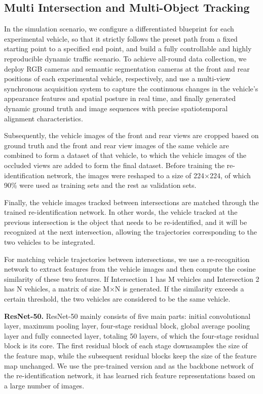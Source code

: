 \documentclass[lettersize,journal]{IEEEtran}
\begin{document}
\subsection{Multi Intersection and Multi-Object Tracking}

In the simulation scenario, we configure a differentiated blueprint for each experimental vehicle, so that it strictly follows the preset path from a fixed starting point to a specified end point, and build a fully controllable and highly reproducible dynamic traffic scenario.
To achieve all-round data collection, we deploy RGB cameras and semantic segmentation cameras at the front and rear positions of each experimental vehicle, respectively, and use a multi-view synchronous acquisition system to capture the continuous changes in the vehicle's appearance features and spatial posture in real time, and finally generated dynamic ground truth and image sequences with precise spatiotemporal alignment characteristics.

Subsequently, the vehicle images of the front and rear views are cropped based on ground truth and the front and rear view images of the same vehicle are combined to form a dataset of that vehicle, to which the vehicle images of the occluded views are added to form the final dataset.
Before training the re-identification network, the images were reshaped to a size of 224\(\times\)224, of which 90\% were used as training sets and the rest as validation sets.

Finally, the vehicle images tracked between intersections are matched through the trained re-identification network.
In other words, the vehicle tracked at the previous intersection is the object that needs to be re-identified, and it will be recognized at the next intersection, allowing the trajectories corresponding to the two vehicles to be integrated.

For matching vehicle trajectories between intersections, we use a re-recognition network to extract features from the vehicle images and then compute the cosine similarity of these two features.
If Intersection 1 has M vehicles and Intersection 2 has N vehicles, a matrix of size M×N is generated. 
If the similarity exceeds a certain threshold, the two vehicles are considered to be the same vehicle.

\textbf{ResNet-50.}
ResNet-50 mainly consists of five main parts: initial convolutional layer, maximum pooling layer, four-stage residual block, global average pooling layer and fully connected layer, totaling 50 layers, of which the four-stage residual block is its core. The first residual block of each stage downsamples the size of the feature map, while the subsequent residual blocks keep the size of the feature map unchanged. We use the pre-trained version and as the backbone network of the re-identification network, it has learned rich feature representations based on a large number of images.
\end{document}
